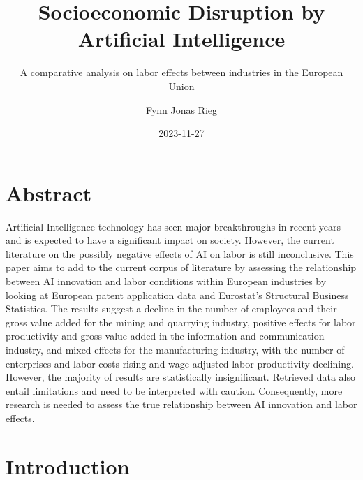 \documentclass[
  12pt,
  a4paperpaper,
]{article}
\title{Socioeconomic Disruption by Artificial Intelligence}
\subtitle{A comparative analysis on labor effects between industries in
the European Union}
\author{Fynn Jonas Rieg}
\date{2023-11-27}
\renewcommand*\contentsname{Table of contents}
\newcommand\contentsname{Table of contents}
\begin{document}
\maketitle
{}
\section*{Abstract}\label{sec-abstract}

Artificial Intelligence technology has seen major breakthroughs in
recent years and is expected to have a significant impact on society.
However, the current literature on the possibly negative effects of AI
on labor is still inconclusive. This paper aims to add to the current
corpus of literature by assessing the relationship between AI innovation
and labor conditions within European industries by looking at European
patent application data and Eurostat's Structural Business Statistics.
The results suggest a decline in the number of employees and their gross
value added for the mining and quarrying industry, positive effects for
labor productivity and gross value added in the information and
communication industry, and mixed effects for the manufacturing
industry, with the number of enterprises and labor costs rising and wage
adjusted labor productivity declining. However, the majority of results
are statistically insignificant. Retrieved data also entail limitations
and need to be interpreted with caution. Consequently, more research is
needed to assess the true relationship between AI innovation and labor
effects.

\newpage{}


\newpage{}

\renewcommand{\contentsname}{Table of Contents}
\tableofcontents

\newpage{}

\listoffigures

\newpage{}

\listoftables

\newpage{}


\section{Introduction}\label{sec-introduction}
\end{document}
